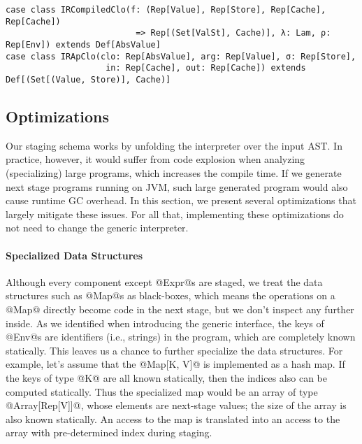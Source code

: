 \begin{lstlisting}
case class IRCompiledClo(f: (Rep[Value], Rep[Store], Rep[Cache], Rep[Cache])
                          => Rep[(Set[ValSt], Cache)], λ: Lam, ρ: Rep[Env]) extends Def[AbsValue]
case class IRApClo(clo: Rep[AbsValue], arg: Rep[Value], σ: Rep[Store],
                    in: Rep[Cache], out: Rep[Cache]) extends Def[(Set[(Value, Store)], Cache)]
\end{lstlisting}

\subsection{Optimizations} \label{staged_ds}

\iffalse
Revision: Solving Practical Challenges.
theoretically, all the things should work nicely. Unfolding the interpreter over the AST.
But the generated code is blowed up. For example .... This should not affect the correctness, 
but poses burden on the MSP system (ie LMS) and the next stage compiler/runtime (ie, scalac and JVM).
1) LMS becomes slower since a large IR graph is contructed during the staging.
2) Scalac becomes slower when reading a such large source code.
JVM has certain limitation on the size of a single method.

TODO: can we formulate selective caching as a partially-static data law.
TODO: lambda lifting for if
\fi

Our staging schema works by unfolding the interpreter over the input AST. In
practice, however, it would suffer from code explosion when analyzing
(specializing) large programs, which increases the compile time. If we generate
next stage programs running on JVM, such large generated program would also
cause runtime GC overhead. In this section, we present several optimizations
that largely mitigate these issues. For all that, implementing these
optimizations do not need to change the generic interpreter.

\paragraph{Specialized Data Structures}

Although every component except @Expr@s are staged, we treat the data
structures such as @Map@s as black-boxes, which means the operations on a @Map@
directly become code in the next stage, but we don't inspect any further inside.
As we identified when introducing the generic interface, the keys of @Env@s are
identifiers (i.e., strings) in the program, which are completely known
statically. This leaves us a chance to further specialize the data structures.
For example, let's assume that the @Map[K, V]@ is implemented as a hash map. If
the keys of type @K@ are all known statically, then the indices also can be
computed statically. Thus the specialized map would be an array of type
@Array[Rep[V]]@, whose elements are next-stage values; the size of the array is
also known statically. An access to the map is translated into an access to the
array with pre-determined index during staging.

